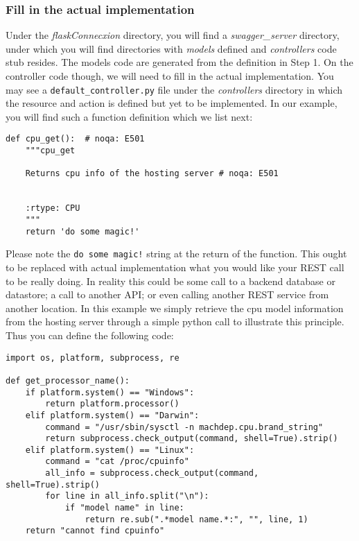 \subsubsection{Fill in the actual
implementation}\label{s:swagger-codegen-implementation}

Under the \emph{flaskConnecxion} directory, you will find a
\emph{swagger\_server} directory, under which you will find directories
with \emph{models} defined and \emph{controllers} code stub resides. The
models code are generated from the definition in Step 1. On the
controller code though, we will need to fill in the actual
implementation. You may see a \texttt{default\_controller.py} file under
the \emph{controllers} directory in which the resource and action is
defined but yet to be implemented. In our example, you will find such a
function definition which we list next:

\begin{lstlisting}
def cpu_get():  # noqa: E501
    """cpu_get

    Returns cpu info of the hosting server # noqa: E501


    :rtype: CPU
    """
    return 'do some magic!'
\end{lstlisting}

Please note the \texttt{do\ some\ magic!} string at the return of the
function. This ought to be replaced with actual implementation what you
would like your REST call to be really doing. In reality this could be
some call to a backend database or datastore; a call to another API; or
even calling another REST service from another location. In this example
we simply retrieve the cpu model information from the hosting server
through a simple python call to illustrate this principle. Thus you can
define the following code:

\begin{lstlisting}
import os, platform, subprocess, re

def get_processor_name():
    if platform.system() == "Windows":
        return platform.processor()
    elif platform.system() == "Darwin":
        command = "/usr/sbin/sysctl -n machdep.cpu.brand_string"
        return subprocess.check_output(command, shell=True).strip()
    elif platform.system() == "Linux":
        command = "cat /proc/cpuinfo"
        all_info = subprocess.check_output(command, shell=True).strip()
        for line in all_info.split("\n"):
            if "model name" in line:
                return re.sub(".*model name.*:", "", line, 1)
    return "cannot find cpuinfo"
\end{lstlisting}

